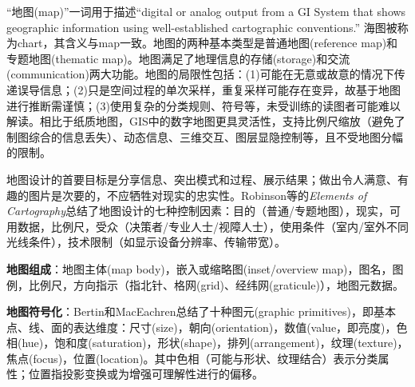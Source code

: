 \par “地图(map)”一词用于描述“digital or analog output from a GI System that shows geographic information using well-established cartographic conventions.” 海图被称为chart，其含义与map一致。地图的两种基本类型是普通地图(reference map)和专题地图(thematic map)。地图满足了地理信息的存储(storage)和交流(communication)两大功能。地图的局限性包括：(1)可能在无意或故意的情况下传递误导信息；(2)只是空间过程的单次采样，重复采样可能存在变异，故基于地图进行推断需谨慎；(3)使用复杂的分类规则、符号等，未受训练的读图者可能难以解读。相比于纸质地图，GIS中的数字地图更具灵活性，支持比例尺缩放（避免了制图综合的信息丢失）、动态信息、三维交互、图层显隐控制等，且不受地图分幅的限制。

\par 地图设计的首要目标是分享信息、突出模式和过程、展示结果；做出令人满意、有趣的图片是次要的，不应牺牲对现实的忠实性。Robinson等的\emph{Elements of Cartography}总结了地图设计的七种控制因素：目的（普通/专题地图），现实，可用数据，比例尺，受众（决策者/专业人士/视障人士），使用条件（室内/室外不同光线条件），技术限制（如显示设备分辨率、传输带宽）。

\par \textbf{地图组成}：地图主体(map body)，嵌入或缩略图(inset/overview map)，图名，图例，比例尺，方向指示（指北针、格网(grid)、经纬网(graticule)），地图元数据。

\par \textbf{地图符号化}：Bertin和MacEachren总结了十种图元(graphic primitives)，即基本点、线、面的表达维度：尺寸(size)，朝向(orientation)，数值(value，即亮度)，色相(hue)，饱和度(saturation)，形状(shape)，排列(arrangement)，纹理(texture)，焦点(focus)，位置(location)。其中色相（可能与形状、纹理结合）表示分类属性；位置指投影变换或为增强可理解性进行的偏移。
